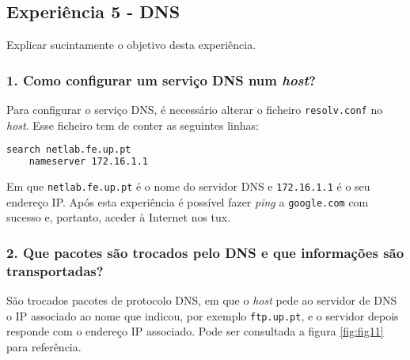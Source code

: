\subsection*{Experiência 5 - DNS}
Explicar sucintamente o objetivo desta experiência.

\subsubsection{1. Como configurar um serviço DNS num \emph{host}?}
Para configurar o serviço DNS, é necessário alterar o ficheiro \verb+resolv.conf+ no \emph{host}. Esse ficheiro tem de conter as seguintes linhas:
\begin{lstlisting}[language=bash]
	search netlab.fe.up.pt
	nameserver 172.16.1.1
\end{lstlisting}

Em que \verb+netlab.fe.up.pt+ é o nome do servidor DNS e \verb+172.16.1.1+ é o seu endereço IP. Após esta experiência é possível fazer \emph{ping} a \verb+google.com+ com sucesso e, portanto, aceder à Internet nos tux.

\subsubsection{2. Que pacotes são trocados pelo DNS e que informações são transportadas?}
São trocados pacotes de protocolo DNS, em que o \emph{host} pede ao servidor de DNS o IP associado ao nome que indicou, por exemplo \verb+ftp.up.pt+, e o servidor depois responde com o endereço IP associado. Pode ser consultada a figura \ref{fig:fig11} para referência. 
